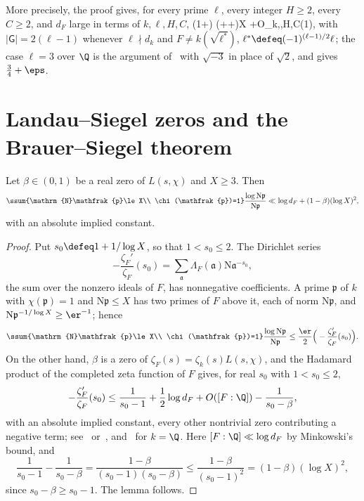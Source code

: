 \documentclass[11pt, reqno, twoside, letterpaper]{amsart}
\newcommand{\Nm}{\mathrm{N}}
\newcommand{\fp}{\mathfrak{p}}
\newcommand{\fa}{\mathfrak{a}}
\newcommand{\auxp}{\ell}
\newcommand{\wgt}{H}
\newcommand{\expC}{C}
\newcommand{\XX}{X}
\newcommand{\galKk}{\mathsf{G}}
\begin{document}
More precisely, the proof gives, for every prime $\auxp$, every
integer $\wgt\ge 2$, every $\expC\ge 2$, and $d_F$ large in terms of
$k,\auxp,\wgt,\expC$,
\be
\ssum{\Nm\fp\le \XX\\ \chi(\fp)=-1}\frac{\log\Nm\fp}{\Nm\fp}
\le\Big(1+\frac{|\galKk|}{2\wgt}\Big)
\Big(+\frac1{|\galKk|}+\frac{1}{2\expC}\Big)\log \XX
+O_{k,\auxp,\wgt,\expC}(1),
\ee
with $|\galKk|=2(\auxp-1)$ whenever $\auxp\nmid d_k$ and
$F\ne k(\sqrt{\auxp^*})$, $\auxp^*\defeq(-1)^{(\auxp-1)/2}\auxp$; the
case $\auxp=3$ over $\Q$ is the argument of~\cite{Ke} with $\sqrt{-3}$
in place of $\sqrt 2$, and gives $\tfrac34+\eps$.

\section{Landau--Siegel zeros and the Brauer--Siegel theorem}
\label{sec:zeros}

\begin{lemma}\label{lem:bias}
Let $\beta\in(0,1)$ be a real zero of $L(s,\chi)$ and $\XX\ge 3$. Then
\[
\ssum{\Nm\fp\le \XX\\ \chi(\fp)=1}\frac{\log\Nm\fp}{\Nm\fp}
\ll\log d_F+(1-\beta)(\log \XX)^2,
\]
with an absolute implied constant.
\end{lemma}

\begin{proof}
Put $s_0\defeq 1+1/\log\XX$, so that $1<s_0\le 2$. The Dirichlet
series
\[
-\frac{\zeta_F'}{\zeta_F}(s_0)=\sum_{\fa}\Lambda_F(\fa)\Nm\fa^{-s_0},
\]
the sum over the nonzero ideals of $F$, has nonnegative
coefficients. A prime $\fp$ of $k$ with $\chi(\fp)=1$ and
$\Nm\fp\le\XX$ has two primes of $F$ above it, each of norm
$\Nm\fp$, and $\Nm\fp^{-1/\log\XX}\ge\er^{-1}$; hence
\[
\ssum{\Nm\fp\le\XX\\ \chi(\fp)=1}\frac{\log\Nm\fp}{\Nm\fp}
\le\frac{\er}{2}\Big(-\frac{\zeta_F'}{\zeta_F}(s_0)\Big).
\]
On the other hand, $\beta$ is a zero of
$\zeta_F(s)=\zeta_k(s)L(s,\chi)$,
and the Hadamard product of the completed zeta function of $F$
gives, for real $s_0$ with $1<s_0\le 2$,
\[
-\frac{\zeta_F'}{\zeta_F}(s_0)
\le\frac1{s_0-1}+\frac12\log d_F+O([F:\Q])-\frac1{s_0-\beta},
\]
with an absolute implied constant, every other nontrivial zero
contributing a negative term; see~\cite[Lemma~3, (9) and (10)]{St}
or~\cite[proof of Lemma~8.1]{LO}, and~\cite[Chapter~14]{Da} for
$k=\Q$. Here
$[F:\Q]\ll\log d_F$ by Minkowski's bound, and
\[
\frac1{s_0-1}-\frac1{s_0-\beta}
=\frac{1-\beta}{(s_0-1)(s_0-\beta)}
\le\frac{1-\beta}{(s_0-1)^2}=(1-\beta)(\log\XX)^2,
\]
since $s_0-\beta\ge s_0-1$. The lemma follows.
\end{proof}
\end{document}

